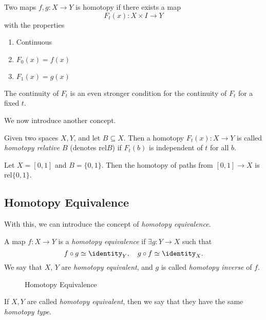\begin{prev}
	Two maps \(f, g\colon X\to Y\) is homotopy if there exists a map
	\[
		F_t(x)\colon X\times I\to Y
	\]
	with the properties
	\begin{enumerate}
		\item Continuous
		\item \(F_0(x) = f(x)\)
		\item \(F_1(x) = g(x)\)
	\end{enumerate}
	\begin{remark}
		The continuity of \(F_t\) is an even stronger condition for the continuity of \(F_t\) for a fixed \(t\).
	\end{remark}
\end{prev}

We now introduce another concept.
\begin{definition}\label{def:homotopy-relative}
	Given two spaces \(X, Y\), and let \(B\subseteq X\). Then a homotopy \(F_t(x)\colon X\to Y\) is called
	\emph{homotopy relative \(B\)} (denotes \(\mathrm{rel} B\)) if \(F_t(b)\) is independent of \(t\) for all \(b\).
\end{definition}

\begin{eg}
	Let \(X = [0, 1]\) and \(B = \{0, 1\}\). Then the homotopy of paths from \([0, 1]\to X\) is \(\mathrm{rel} \{0, 1\}\).
	\begin{figure}[H]
		\centering
		\label{fig:eg:rel-homotopy}
	\end{figure}
\end{eg}

\subsection{Homotopy Equivalence}
With this, we can introduce the concept of \emph{homotopy equivalence}.
\begin{definition}\label{def:homotopy-equivalence}
	A map \(f\colon X\to Y\) is a \emph{homotopy equivalence} if \(\exists g\colon Y\to X\) such that
	\[
		f\circ g \simeq \identity_Y, \quad g\circ f \simeq \identity_X.
	\]
	We say that \(X\), \(Y\) are \emph{homotopy equivalent}, and \(g\) is called \emph{homotopy inverse} of \(f\).
\end{definition}
\begin{figure}[H]
	\centering
	\caption{Homotopy Equivalence}
	\label{fig:def:homotopy-equivalence}
\end{figure}
If \(X, Y\) are called \emph{homotopy equivalent}, then we say that they have the same \emph{homotopy type}.

